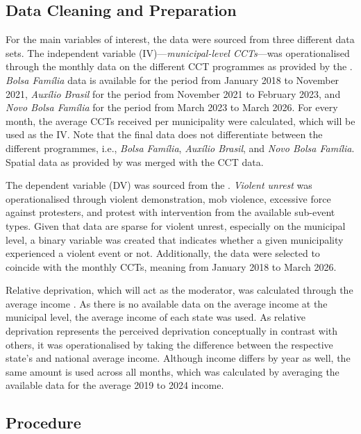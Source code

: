 \documentclass[stu,12pt]{apa7}
\begin{document}


\subsection{Data Cleaning and Preparation}

For the main variables of interest, the data were sourced from three different data sets. The independent variable (IV)—\textit{municipal-level CCTs}—was operationalised through the monthly data on the different CCT programmes as provided by the \textcite{CECAD20a}. \textit{Bolsa Família} data is available for the period from January 2018 to November 2021, \textit{Auxílio Brasil} for the period from November 2021 to February 2023, and \textit{Novo Bolsa Família} for the period from March 2023 to March 2026. For every month, the average CCTs received per municipality were calculated, which will be used as the IV. Note that the final data does not differentiate between the different programmes, i.e., \textit{Bolsa Família}, \textit{Auxílio Brasil}, and \textit{Novo Bolsa Família}. Spatial data as provided by \textcite{pradoKelvinsMunicipiosbrasileiros2026} was merged with the CCT data.

The dependent variable (DV) was sourced from the \textcite{ACLED2026}. \textit{Violent unrest} was operationalised through violent demonstration, mob violence, excessive force against protesters, and protest with intervention from the available sub-event types. Given that data are sparse for violent unrest, especially on the municipal level, a binary variable was created that indicates whether a given municipality experienced a violent event or not. Additionally, the data were selected to coincide with the monthly CCTs, meaning from January 2018 to March 2026.

Relative deprivation, which will act as the moderator, was calculated through the average income \parencite{Tabela7395Rendimento}. As there is no available data on the average income at the municipal level, the average income of each state was used. As relative deprivation represents the perceived deprivation conceptually in contrast with others, it was operationalised by taking the difference between the respective state’s and national average income. Although income differs by year as well, the same amount is used across all months, which was calculated by averaging the available data for the average 2019 to 2024 income.

\subsection{Procedure}
\end{document}
